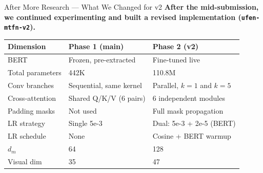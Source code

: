 \documentclass[aspectratio=169]{beamer}
\begin{document}
\begin{frame}{After More Research — What We Changed for v2}
  \vspace{-4pt}
  \small\textbf{After the mid-submission, we continued experimenting and built
  a revised implementation (\texttt{ufen-mtfn-v2}).}

  \smallskip

  \renewcommand{\arraystretch}{1.12}
  \small
  \begin{tabular}{p{3.6cm} p{3.8cm} p{3.8cm}}
    \toprule
    \textbf{Dimension} & \textbf{Phase 1 (main)} & \textbf{Phase 2 (v2)} \\
    \midrule
    BERT               & Frozen, pre-extracted   & \cellcolor{goodgreen!20}Fine-tuned live \\
    Total parameters   & 442K                    & \cellcolor{goodgreen!20}110.8M \\
    Conv branches      & Sequential, same kernel & \cellcolor{goodgreen!20}Parallel, $k=1$ and $k=5$ \\
    Cross-attention    & Shared Q/K/V (6 pairs)  & \cellcolor{goodgreen!20}6 independent modules \\
    Padding masks      & Not used                & \cellcolor{goodgreen!20}Full mask propagation \\
    LR strategy        & Single 5e-3             & \cellcolor{goodgreen!20}Dual: 5e-3 + 2e-5 (BERT) \\
    LR schedule        & None                    & \cellcolor{goodgreen!20}Cosine + BERT warmup \\
    $d_m$              & 64                      & \cellcolor{goodgreen!20}128 \\
    Visual dim         & 35                      & \cellcolor{goodgreen!20}47 \\
    \bottomrule
  \end{tabular}
\end{frame}
\end{document}
